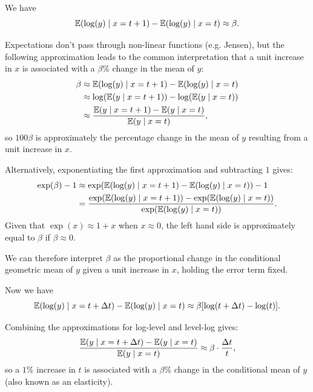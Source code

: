 \begin{remark}
	We have \[
		\mathbb{E}(\log(y) \mid x = t + 1) - \mathbb{E}(\log(y) \mid x = t) \approx \beta
	.\] 
	
		Expectations don't pass through non-linear functions (e.g. Jensen), but the following approximation leads to the common interpretation that a unit increase in $x$ is associated with a $\beta\%$ change in the mean of $y$: \begin{align*}
			\beta &\approx \mathbb{E}(\log(y) \mid x = t + 1) - \mathbb{E}(\log(y) \mid x = t) \\
			&\approx \log(\mathbb{E}(y \mid x = t + 1)) - \log(\mathbb{E}(y \mid x = t)) \\
			&\approx \frac{\mathbb{E}(y \mid x = t + 1) - \mathbb{E}(y \mid x = t)}{\mathbb{E}(y \mid x = t)}
	,\end{align*} so $100\beta$ is approximately the percentage change in the mean of $y$ resulting from a unit increase in $x$.
	
	Alternatively, exponentiating the first approximation and subtracting $1$ gives: \begin{align*}
		\exp(\beta) - 1 &\approx \exp(\mathbb{E}(\log(y) \mid x = t + 1) - \mathbb{E}(\log(y) \mid x = t)) - 1 \\
		&= \frac{\exp(\mathbb{E}(\log(y) \mid x = t + 1)) - \exp(\mathbb{E}(\log(y) \mid x = t))}{\exp(\mathbb{E}(\log(y) \mid x = t))}
	.\end{align*}
	Given that $\exp(x) \approx 1 + x$ when $x \approx 0$, the left hand side is approximately equal to $\beta$ if $\beta \approx 0$.
	
	We can therefore interpret $\beta$ as the proportional change in the conditional geometric mean of $y$ given a unit increase in $x$, holding the error term fixed.
\end{remark}

\begin{remark}
	Now we have \[
		\mathbb{E}(\log(y) \mid x = t + \Delta t) - \mathbb{E}(\log(y) \mid x = t) \approx \beta[\log(t + \Delta t) - \log(t)]
	.\] 
	
	Combining the approximations for log-level and level-log gives: \[
		\frac{\mathbb{E}(y \mid x = t + \Delta t) - \mathbb{E}(y \mid x = t)}{\mathbb{E}(y \mid x = t)} \approx \beta \cdot \frac{\Delta t}{t}
	,\] so a $1\%$ increase in $t$ is associated with a $\beta\%$ change in the conditional mean of $y$ (also known as an elasticity).
\end{remark}

